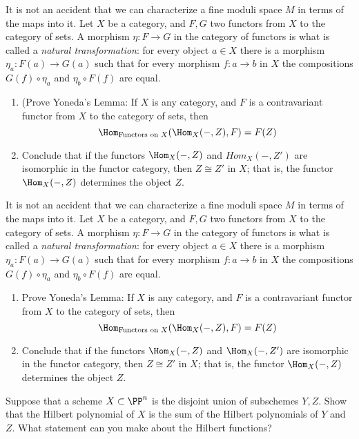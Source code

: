 \begin{exercise}
It is not an accident that we can characterize a fine moduli space $M$ in terms of the maps into it. 
 Let $X$ be a category, and $F,G$ two functors from $X$ to the category of sets.
 A morphism $\eta: F\to G$ in the category of functors is what is called a \emph{natural transformation}:
 for every object $a\in X$ there is a morphism $\eta_a:F(a) \to G(a)$ such that for every
 morphism $f: a\to b$ in $X$ the compositions $G(f)\circ \eta_a$ and $\eta_b\circ F(f)$
 are equal. 
\begin{enumerate}
 \item (Prove Yoneda's Lemma: If $X$ is any category, and $F$ is a contravariant functor from $X$ to the category of sets, then 
 $$
 \Hom_{\hbox{\scriptsize Functors on $X$}}(\Hom_X( -, Z), F) = F(Z)
 $$
 \item Conclude that if the functors $\Hom_X( -, Z)$ and $Hom_X( -, Z')$ are isomorphic in the functor category, 
 then $Z \cong Z'$ in $X$; that is, the functor $\Hom_X( -, Z)$ determines the object $Z$.
 \end{enumerate}
\end{exercise}



\begin{exercise}
It is not an accident that we can characterize a fine moduli space $M$ in terms of the maps into it. 
 Let $X$ be a category, and $F,G$ two functors from $X$ to the category of sets.
 A morphism $\eta: F\to G$ in the category of functors is what is called a \emph{natural transformation}:
 for every object $a\in X$ there is a morphism $\eta_a:F(a) \to G(a)$ such that for every
 morphism $f: a\to b$ in $X$ the compositions $G(f)\circ \eta_a$ and $\eta_b\circ F(f)$
 are equal. 
\begin{enumerate}
 \item Prove Yoneda's Lemma: If $X$ is any category, and $F$ is a contravariant functor from $X$ to the category of sets, then 
 $$
 \Hom_{\hbox{\scriptsize Functors on $X$}}(\Hom_X( -, Z), F) = F(Z)
 $$
 \item Conclude that if the functors $\Hom_X( -, Z)$ and $\Hom_X( -, Z')$ are isomorphic in the functor category, 
 then $Z \cong Z'$ in $X$; that is, the functor $\Hom_X( -, Z)$ determines the object $Z$.
 \end{enumerate}
\end{exercise}

\begin{exercise}\label{deg of disjoint union}
Suppose that a scheme $X\subset \PP^n$ is the disjoint union of subschemes $Y,Z$. Show that the Hilbert polynomial of
$X$ is the sum of the Hilbert polynomials of $Y$ and $Z$. What statement can you make about the Hilbert functions?
\end{exercise}


